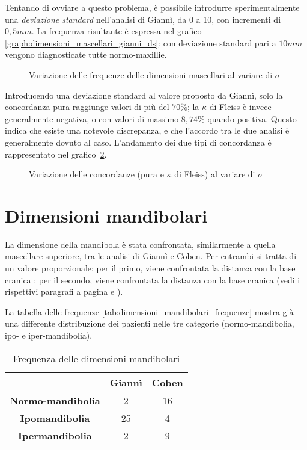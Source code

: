 Tentando di ovviare a questo problema, è possibile introdurre sperimentalmente una \emph{deviazione standard} nell'analisi di Giannì, da 0 a 10, con incrementi di $0,5 mm$. La frequenza risultante è espressa nel grafico \vref{graph:dimensioni_mascellari_gianni_ds}: con deviazione standard pari a $10 mm$ vengono diagnosticate tutte normo-maxillie.

\begin{figure}[ht!]
\centering

\caption{Variazione delle frequenze delle dimensioni mascellari al variare di $\sigma$}
\label{graph:dimensioni_mascellari_gianni_ds}
\end{figure}

Introducendo una deviazione standard al valore proposto da Giannì, solo la concordanza pura raggiunge valori di più del $70\%$; la $\kappa$ di Fleiss è invece generalmente negativa, o con valori di massimo $8,74\%$ quando positiva. Questo indica che esiste una notevole discrepanza, e che l'accordo tra le due analisi è generalmente dovuto al caso. L'andamento dei due tipi di concordanza è rappresentato nel grafico~\ref{graph:dimensioni_mascellari_concordanze}.

\begin{figure}[ht!]
\centering

\caption{Variazione delle concordanze (pura e $\kappa$ di Fleiss) al variare di $\sigma$}
\label{graph:dimensioni_mascellari_concordanze}
\end{figure}

\section{Dimensioni mandibolari}
La dimensione della mandibola è stata confrontata, similarmente a quella mascellare superiore, tra le analisi di Giannì e Coben. Per entrambi si tratta di un valore proporzionale: per il primo, viene confrontata la distanza  con la base cranica ; per il secondo, viene confrontata la distanza  con la base cranica  (vedi i rispettivi paragrafi a pagina \pageref{sec:giannì_mandibola} e \pageref{sec:coben_mandibola}).

La tabella delle frequenze \vref{tab:dimensioni_mandibolari_frequenze} mostra già una differente distribuzione dei pazienti nelle tre categorie (normo-mandibolia, ipo- e iper-mandibolia).

\begin{table}[h]
\centering
\caption{Frequenza delle dimensioni mandibolari}
\label{tab:dimensioni_mandibolari_frequenze}
\begin{tabular}{>{\bfseries}ccc}
\toprule
 & \textbf{Giannì} & \textbf{Coben} \\
\midrule
Normo-mandibolia & 2 & 16 \\
Ipomandibolia & 25 & 4 \\
Ipermandibolia & 2 & 9 \\
\bottomrule
\end{tabular}
\end{table}

